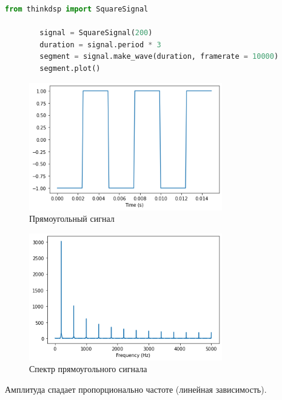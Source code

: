\documentclass[a4paper, 12pt]{report}
\begin{document}
	\begin{lstlisting}[language=Python,caption=Построение прямоугольного сигнала]
		from thinkdsp import SquareSignal

		signal = SquareSignal(200)
		duration = signal.period * 3
		segment = signal.make_wave(duration, framerate = 10000)
		segment.plot()
	\end{lstlisting}
	\begin{figure}[H]
		\centering
		\includegraphics[width=0.75\textwidth]{sq_segment.png}
		\caption{Прямоугольный сигнал}
		\label{fig:sq_segment}
	\end{figure}
	\begin{figure}[H]
		\centering
		\includegraphics[width=0.75\textwidth]{sq_spectrum.png}
		\caption{Спектр прямоугольного сигнала}
		\label{fig:sq_spectrum}
	\end{figure}
	Амплитуда спадает пропорционально частоте (линейная зависимость).
\end{document}
